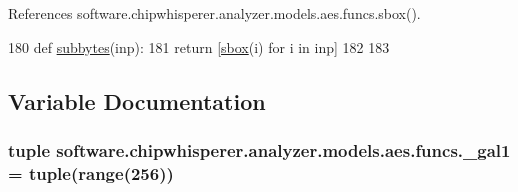 References software.\+chipwhisperer.\+analyzer.\+models.\+aes.\+funcs.\+sbox().


\begin{DoxyCode}
180 \textcolor{keyword}{def }\hyperlink{namespacesoftware_1_1chipwhisperer_1_1analyzer_1_1models_1_1aes_1_1funcs_a37c3bb10e993293ccac1cb8edec7f0d8}{subbytes}(inp):
181     \textcolor{keywordflow}{return} [\hyperlink{namespacesoftware_1_1chipwhisperer_1_1analyzer_1_1models_1_1aes_1_1funcs_a9335c0b10ef1748bf1a43d986584b6cc}{sbox}(i) \textcolor{keywordflow}{for} i \textcolor{keywordflow}{in} inp]
182 
183 
\end{DoxyCode}


\subsection{Variable Documentation}
\hypertarget{namespacesoftware_1_1chipwhisperer_1_1analyzer_1_1models_1_1aes_1_1funcs_abf6284395a0d7bc25cb4b3025ad0c365}{}
\subsubsection[{\+\_\+gal1}]{\setlength{\rightskip}{0pt plus 5cm}tuple software.\+chipwhisperer.\+analyzer.\+models.\+aes.\+funcs.\+\_\+gal1 = tuple(range(256))}\label{namespacesoftware_1_1chipwhisperer_1_1analyzer_1_1models_1_1aes_1_1funcs_abf6284395a0d7bc25cb4b3025ad0c365}
\hypertarget{namespacesoftware_1_1chipwhisperer_1_1analyzer_1_1models_1_1aes_1_1funcs_a526b4a460be415479454f3a77d495d27}{}
